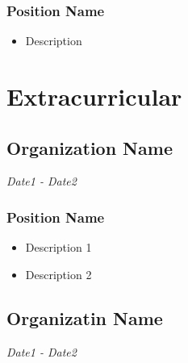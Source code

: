 \documentclass{article}
\renewcommand{\date}[1]{
    \hfill{\normalsize\textit{#1}}
}
\begin{document}
            \subsubsection{Position Name}
                \begin{itemize}
                    \item Description
                \end{itemize}

    \section{Extracurricular}
    \subsection{Organization Name}\date{Date1 - Date2} %
        \subsubsection{Position Name}
            \begin{itemize}
                \item Description 1
                \item Description 2
            \end{itemize}
    \subsection{Organizatin Name}\date{Date1 - Date2} %
\end{document}
